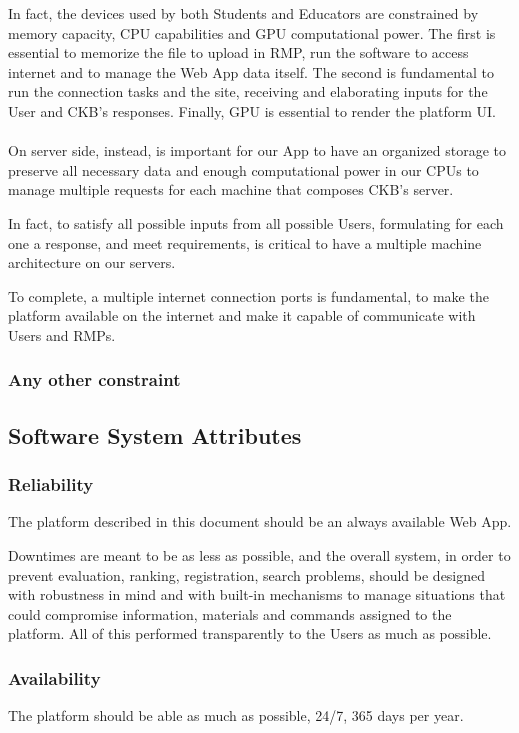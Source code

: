 In fact, the devices used by both Students and Educators are constrained by memory capacity, CPU capabilities and GPU computational power. The first is essential to memorize the file to upload in RMP, run the software to access internet
 and to manage the Web App data itself. The second is fundamental to run the connection tasks and the site, receiving and elaborating inputs for the User and CKB's responses. Finally, GPU is essential to render the platform UI.\\
\\
 On server side, instead, is important for our App to have an organized storage to preserve all necessary data and enough computational power in our CPUs to manage multiple requests for each machine that composes CKB's server. 
 
In fact, to satisfy all possible inputs from all possible Users, formulating for each one a response, and meet requirements, is critical to have a multiple machine architecture on our servers. 

To complete, a multiple internet connection ports is fundamental, to make the platform available on the internet and make it capable of communicate with Users and RMPs.
\subsubsection{Any other constraint}

\subsection{Software System Attributes}

\subsubsection{Reliability}
The platform described in this document should be an always available Web App. 

Downtimes are meant to be as less as possible, and the overall system, in order to prevent evaluation, ranking, registration, search problems, should be designed with robustness in mind and with built-in mechanisms to manage situations 
that could compromise information, materials and commands assigned to the platform. All of this performed transparently to the Users as much as possible.

\subsubsection{Availability}
The platform should be able as much as possible, 24/7, 365 days per year. 

